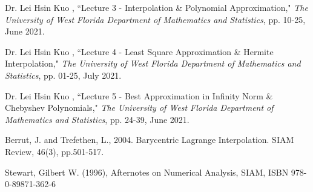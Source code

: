 \documentclass[11pt]{article}%
\begin{document}
\begin{thebibliography}{9}

 Dr. Lei Hsin Kuo , ``Lecture 3 - Interpolation \& Polynomial Approximation," \emph{The University of West Florida Department of Mathematics and Statistics}, pp. 10-25, June 2021.

 Dr. Lei Hsin Kuo , ``Lecture 4 - Least Square Approximation \& Hermite Interpolation," \emph{The University of West Florida Department of Mathematics and Statistics}, pp. 01-25, July 2021.

 Dr. Lei Hsin Kuo , ``Lecture 5 - Best Approximation in Infinity Norm \& Chebyshev Polynomials," \emph{The University of West Florida Department of Mathematics and Statistics}, pp. 24-39, June 2021.

 Berrut, J. and Trefethen, L., 2004. Barycentric Lagrange Interpolation. SIAM Review, 46(3), pp.501-517.

 Stewart, Gilbert W. (1996), Afternotes on Numerical Analysis, SIAM, ISBN 978-0-89871-362-6

\end{thebibliography}
\end{document}
